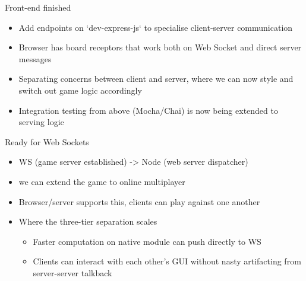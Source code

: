 \documentclass[allowframebreaks]{beamer}
\begin{document}
\begin{frame}[label={sec:orgc0c0c5c}]{Front-end finished}
\begin{itemize}
\item Add endpoints on `dev-express-js` to specialise client-server communication
\item Browser has board receptors that work both on Web Socket and direct server messages
\item Separating concerns between client and server, where we can now style and switch out game logic
accordingly
\item Integration testing from above (Mocha/Chai) is now being extended to serving logic
\end{itemize}
\end{frame}
\begin{frame}[label={sec:org20c3378}]{Ready for Web Sockets}
\begin{itemize}
\item WS (game server established) -> Node (web server dispatcher)
\item we can extend the game to online multiplayer
\item Browser/server supports this, clients can play against one another
\item Where the three-tier separation scales
\begin{itemize}
\item Faster computation on native module can push directly to WS
\item Clients can interact with each other's GUI without nasty artifacting from server-server talkback
\end{itemize}
\end{itemize}
\end{frame}
\end{document}
